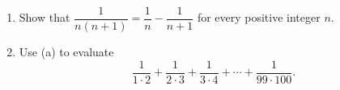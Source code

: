 \begin{enumerate}
\item[(a)] Show that $\dfrac{1}{n(n+1)}=\dfrac{1}{n}-\dfrac{1}{n+1}$ for every positive integer $n$.
\item[(b)] Use (a) to evaluate
\[\dfrac{1}{1\cdot2}+\dfrac{1}{2\cdot3}+\dfrac{1}{3\cdot4}+\cdots+\dfrac{1}{99\cdot100}.\]
\end{enumerate}
